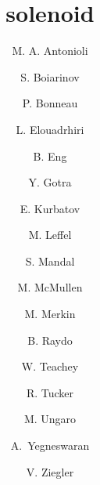 \title{solenoid}

\author[A]{M. A. Antonioli}
\author[A]{S. Boiarinov}
\author[A]{P. Bonneau}
\author[A]{L. Elouadrhiri}
\author[A]{B. Eng}
\author[A]{Y. Gotra}
\author[B]{E. Kurbatov}
\author[A]{M. Leffel}
\author[A]{S. Mandal}
\author[A]{M. McMullen}
\author[B]{M. Merkin}
\author[A]{B. Raydo}
\author[A]{W. Teachey}
\author[C]{R. Tucker}
\author[A]{M. Ungaro}
\author[A]{A.~Yegneswaran}
\author[A]{V. Ziegler}

\address[A]{Thomas Jefferson National Accelerator Facility, Newport News, VA, USA}
\address[B]{Skobeltsyn Institute of Nuclear Physics, Moscow State University, Moscow, Russia}
\address[C]{Arizona State University, Tempe, AZ}
